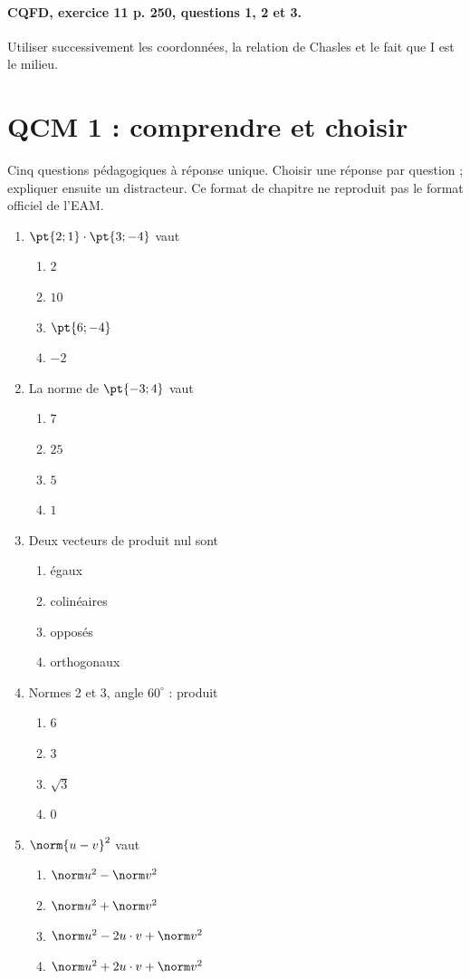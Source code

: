 \paragraph{CQFD, exercice 11 p. 250, questions 1, 2 et 3.}\label{C03-M2} Utiliser successivement les coordonnées, la relation de Chasles et le fait que I est le milieu.
\begingroup\small
\mxnewpage\section*{QCM 1 : comprendre et choisir}\label{C03-Q1}
Cinq questions pédagogiques à réponse unique. Choisir une réponse par question ; expliquer ensuite un distracteur. Ce format de chapitre ne reproduit pas le format officiel de l’EAM.
\begin{enumerate}
\item $\pt{2;1}\cdot\pt{3;-4}$ vaut
\begin{enumerate}[label=\Alph*.,itemsep=2pt]
\item $2$
\item $10$
\item $\pt{6;-4}$
\item $-2$
\end{enumerate}
\item La norme de $\pt{-3;4}$ vaut
\begin{enumerate}[label=\Alph*.,itemsep=2pt]
\item $7$
\item $25$
\item $5$
\item $1$
\end{enumerate}
\item Deux vecteurs de produit nul sont
\begin{enumerate}[label=\Alph*.,itemsep=2pt]
\item égaux
\item colinéaires
\item opposés
\item orthogonaux
\end{enumerate}
\item Normes 2 et 3, angle $60^\circ$ : produit
\begin{enumerate}[label=\Alph*.,itemsep=2pt]
\item $6$
\item $3$
\item $\sqrt3$
\item $0$
\end{enumerate}
\item $\norm{u-v}^2$ vaut
\begin{enumerate}[label=\Alph*.,itemsep=2pt]
\item $\norm u^2-\norm v^2$
\item $\norm u^2+\norm v^2$
\item $\norm u^2-2u\cdot v+\norm v^2$
\item $\norm u^2+2u\cdot v+\norm v^2$
\end{enumerate}
\end{enumerate}
